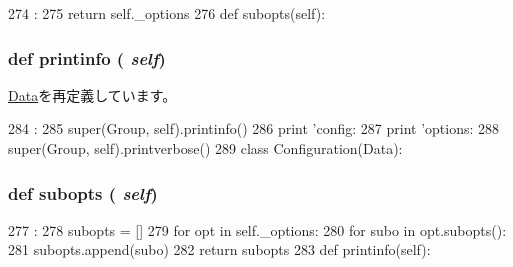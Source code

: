 \begin{DoxyCode}
274                      :
275         return self._options
276 
    def subopts(self):
\end{DoxyCode}
\hypertarget{classm5_1_1util_1_1jobfile_1_1Group_a40bc1aa85be1c4ba18cd144234c53984}{
\subsubsection[{printinfo}]{\setlength{\rightskip}{0pt plus 5cm}def printinfo ( {\em self})}}
\label{classm5_1_1util_1_1jobfile_1_1Group_a40bc1aa85be1c4ba18cd144234c53984}


\hyperlink{classm5_1_1util_1_1jobfile_1_1Data_a40bc1aa85be1c4ba18cd144234c53984}{Data}を再定義しています。


\begin{DoxyCode}
284                        :
285         super(Group, self).printinfo()
286         print 'config: %
287         print 'options: %
288         super(Group, self).printverbose()
289 
class Configuration(Data):
\end{DoxyCode}
\hypertarget{classm5_1_1util_1_1jobfile_1_1Group_a5f5171e812f65a70d0876081203f320f}{
\subsubsection[{subopts}]{\setlength{\rightskip}{0pt plus 5cm}def subopts ( {\em self})}}
\label{classm5_1_1util_1_1jobfile_1_1Group_a5f5171e812f65a70d0876081203f320f}



\begin{DoxyCode}
277                      :
278         subopts = []
279         for opt in self._options:
280             for subo in opt.subopts():
281                 subopts.append(subo)
282         return subopts
283 
    def printinfo(self):
\end{DoxyCode}


